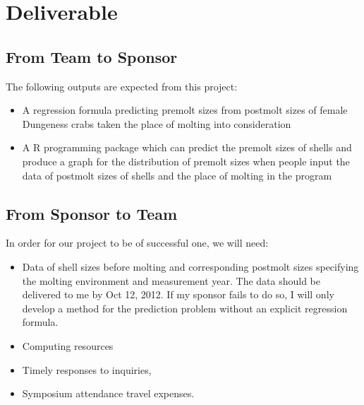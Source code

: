 \documentclass[12pt,letterpaper]{article}
\theoremstyle{definition}
\begin{document}
\section{Deliverable}
\subsection{From Team to Sponsor} %
The following outputs are expected from this project:
\begin{itemize}
    \item A regression formula predicting premolt sizes from postmolt sizes of female Dungeness crabs taken the place of molting into consideration
    \item A R programming package which can predict the premolt sizes of shells and produce a graph for the distribution of premolt sizes when people input the data of postmolt sizes of shells and the place of molting in the program
\end{itemize}

\subsection{From Sponsor to Team} %

In order for our project to be of successful one, we will need:
\begin{itemize}
    \item Data of shell sizes before molting and corresponding postmolt sizes specifying the molting environment and measurement year. The data should be delivered to me by Oct 12, 2012. If my sponsor fails to do so, I will only develop a method for the prediction problem without an explicit regression formula.
    \item Computing resources
    \item Timely responses to inquiries, 
    \item Symposium attendance travel expenses.
\end{itemize}



\end{document}
